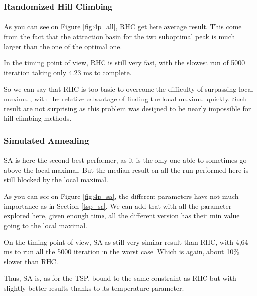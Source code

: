 \documentclass[twocolumn,a4paper,10pt]{article}
\begin{document}
\subsubsection{Randomized Hill Climbing}

\paragraph{}

As you can see on Figure \ref{fig:4p_all}, RHC get here average result.
This come from the fact that the attraction basin for the two suboptimal
peak is much larger than the one of the optimal one.

In the timing point of view, RHC is still very fast, with the slowest
run of 5000 iteration taking only 4.23 ms to complete.

So we can say that RHC is too basic to overcome the difficulty of
surpassing local maximal, with the relative advantage of finding the
local maximal quickly. Such result are not surprising as this problem
was designed to be nearly impossible for hill-climbing methods. 

\subsubsection{Simulated Annealing}

\paragraph{}

SA is here the second best performer, as it is the only one able to
sometimes go above the local maximal. But the median result on all
the run performed here is still blocked by the local maximal.

As you can see on Figure \ref{fig:4p_sa}, the different parameters
have not much importance as in Section \ref{tsp_sa}. We can add that
with all the parameter explored here, given enough time, all the different
version has their min value going to the local maximal.

On the timing point of view, SA as still very similar result than
RHC, with 4,64 ms to run all the 5000 iteration in the worst case.
Which is again, about 10\% slower than RHC.

Thus, SA is, as for the TSP, bound to the same constraint as RHC but
with slightly better results thanks to its temperature parameter.
\end{document}
